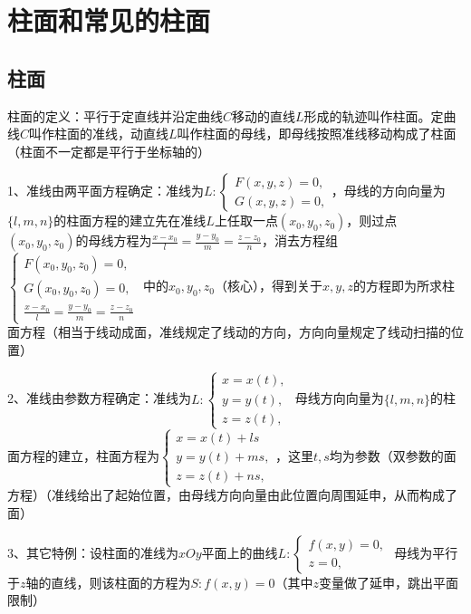 \section{柱面和常见的柱面}



\subsection{柱面}

柱面的定义：平行于定直线并沿定曲线$C$移动的直线$L$形成的轨迹叫作柱面。定曲线$C$叫作柱面的准线，动直线$L$叫作柱面的母线，即母线按照准线移动构成了柱面（柱面不一定都是平行于坐标轴的）

1、准线由两平面方程确定：准线为$L:\left\{\begin{array}{l}F(x, y, z)=0, \\ G(x, y, z)=0,\end{array}\right.$，母线的方向向量为$\{l, m, n\}$的柱面方程的建立先在准线$L$上任取一点$\left(x_{0}, y_{0}, z_{0}\right)$，则过点$\left(x_{0}, y_{0}, z_{0}\right)$的母线方程为$\frac{x-x_{0}}{l}=\frac{y-y_{0}}{m}=\frac{z-z_{0}}{n}$，消去方程组$\left\{\begin{array}{l}F\left(x_{0}, y_{0}, z_{0}\right)=0, \\ G\left(x_{0}, y_{0}, z_{0}\right)=0, \\ \frac{x-x_{0}}{l}=\frac{y-y_{0}}{m}=\frac{z-z_{0}}{n}\end{array}\right.$ 中的$x_{0}, y_{0}, z_{0}$（核心），得到关于$x, y, z$的方程即为所求柱面方程（相当于线动成面，准线规定了线动的方向，方向向量规定了线动扫描的位置）

2、准线由参数方程确定：准线为$L:\left\{\begin{array}{l}x=x(t), \\ y=y(t),  \\ z=z(t), \end{array}\right.$ 母线方向向量为$\{l, m, n\}$的柱面方程的建立，柱面方程为$\left\{\begin{array}{l}x=x(t)+l s \\ y=y(t)+m s, \\ z=z(t)+n s,\end{array}\right.$，这里$t, s$均为参数（双参数的面方程）（准线给出了起始位置，由母线方向向量由此位置向周围延申，从而构成了面）

3、其它特例：设柱面的准线为$x O y$平面上的曲线$L:\left\{\begin{array}{l}f(x, y)=0,\\ z=0,\end{array}\right.$ 母线为平行于$z$轴的直线，则该柱面的方程为$S: f(x, y)=0$（其中$z$变量做了延申，跳出平面限制）



